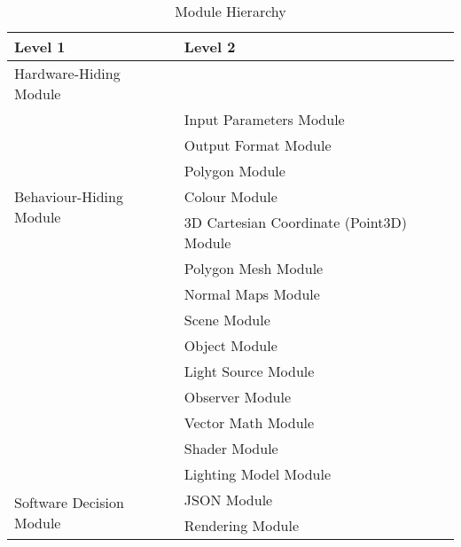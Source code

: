 \documentclass[12pt, titlepage]{article}
\begin{document}
\begin{table}[h!]
	\centering
	\begin{tabular}{p{} p{}}
		\toprule
		\textbf{Level 1} & \textbf{Level 2}\\
		\midrule
		
		{Hardware-Hiding Module} & ~ \\
		\midrule
		
		\multirow{7}{0.3\textwidth}{Behaviour-Hiding Module} & Input Parameters 
		Module\\
		& Output Format Module \\
		& Polygon Module\\
		& Colour Module\\
		& 3D Cartesian Coordinate (Point3D) Module\\ %
		& Polygon Mesh Module\\ %
		& Normal Maps Module\\ %
		& Scene Module\\
		& Object Module\\
		& Light Source Module\\
		& Observer Module \\
		& Vector Math Module\\ %
		& Shader Module\\
		& Lighting Model Module\\
		\midrule
		\multirow{2}{0.3\textwidth}{Software Decision Module} 
		& JSON Module\\ %
		& Rendering Module\\ %
		\bottomrule
		
	\end{tabular}
	\caption{Module Hierarchy}
	\label{TblMH}
\end{table}
\end{document}

